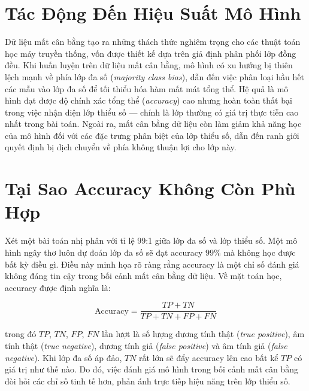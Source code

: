 \section{Tác Động Đến Hiệu Suất Mô Hình}

Dữ liệu mất cân bằng tạo ra những thách thức nghiêm trọng cho các thuật toán học máy truyền thống, vốn được thiết kế dựa trên giả định phân phối lớp đồng đều. Khi huấn luyện trên dữ liệu mất cân bằng, mô hình có xu hướng bị thiên lệch mạnh về phía lớp đa số (\textit{majority class bias}), dẫn đến việc phân loại hầu hết các mẫu vào lớp đa số để tối thiểu hóa hàm mất mát tổng thể. Hệ quả là mô hình đạt được độ chính xác tổng thể (\textit{accuracy}) cao nhưng hoàn toàn thất bại trong việc nhận diện lớp thiểu số --- chính là lớp thường có giá trị thực tiễn cao nhất trong bài toán. Ngoài ra, mất cân bằng dữ liệu còn làm giảm khả năng học của mô hình đối với các đặc trưng phân biệt của lớp thiểu số, dẫn đến ranh giới quyết định bị dịch chuyển về phía không thuận lợi cho lớp này.

\section{Tại Sao Accuracy Không Còn Phù Hợp}

Xét một bài toán nhị phân với tỉ lệ 99:1 giữa lớp đa số và lớp thiểu số. Một mô hình ngây thơ luôn dự đoán lớp đa số sẽ đạt accuracy $99\%$ mà không học được bất kỳ điều gì. Điều này minh họa rõ ràng rằng accuracy là một chỉ số đánh giá không đáng tin cậy trong bối cảnh mất cân bằng dữ liệu. Về mặt toán học, accuracy được định nghĩa là:

\begin{equation}
  \text{Accuracy} = \frac{TP + TN}{TP + TN + FP + FN}
  \label{eq:accuracy}
\end{equation}

\noindent trong đó $TP$, $TN$, $FP$, $FN$ lần lượt là số lượng dương tính thật (\textit{true positive}), âm tính thật (\textit{true negative}), dương tính giả (\textit{false positive}) và âm tính giả (\textit{false negative}). Khi lớp đa số áp đảo, $TN$ rất lớn sẽ đẩy accuracy lên cao bất kể $TP$ có giá trị như thế nào. Do đó, việc đánh giá mô hình trong bối cảnh mất cân bằng đòi hỏi các chỉ số tinh tế hơn, phản ánh trực tiếp hiệu năng trên lớp thiểu số.

